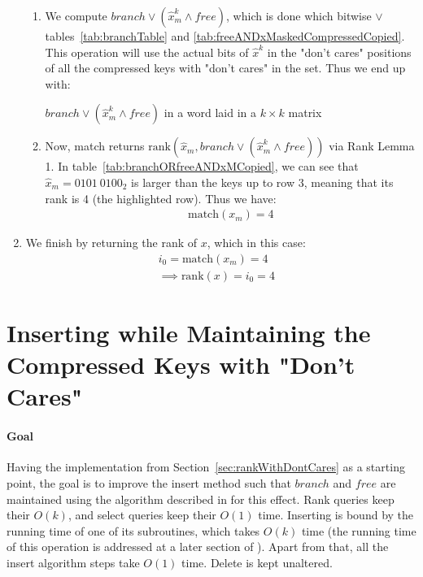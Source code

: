 \begin{enumerate}
\begin{enumerate}
        \item
        We compute $branch \vee (\hat x^k_m \wedge free)$, which is done which bitwise $\vee$ tables~\ref{tab:branchTable} and \ref{tab:freeANDxMaskedCompressedCopied}.
        This operation will use the actual bits of $\hat x^k$ in the "don't cares" positions of all the compressed keys with "don't cares" in the set.
        Thus we end up with:
        \begin{table}[H]
        \centering
        
        \caption[Example of $branch \vee (\hat x^k_m \wedge free)$ in a word laid in a $k \times k$ matrix]{$branch \vee (\hat x^k_m \wedge free)$ in a word laid in a $k \times k$ matrix}
        \label{tab:branchORfreeANDxMCopied}
        \end{table}
        
        \item
        Now, match returns $\text{rank}(\hat x_m, branch \vee (\hat x^k_m \wedge free))$ via Rank Lemma 1. In table~\ref{tab:branchORfreeANDxMCopied}, we can see that $\hat x_m = 0101\ 0100_2$ is larger than the keys up to row 3, meaning that its rank is 4 (the highlighted row). Thus we have:
        \begin{align*}
            \text{match}(x_m) = 4
        \end{align*}
    \end{enumerate}
    
    \item
    We finish by returning the rank of $x$, which in this case:
    \begin{align*}
        i_0 = \text{match}(x_m) = 4& \\
        \implies \text{rank}(x) = i_0 = 4&
    \end{align*}
\end{enumerate}

\newpage
\section{Inserting while Maintaining the Compressed Keys with "Don't Cares"} \label{sec:InsertDontCares}

\paragraph*{Goal}
Having the implementation from Section~\ref{sec:rankWithDontCares} as a starting point, the goal is to improve the insert method such that $branch$ and $free$ are maintained using the algorithm described in \cite{patrascu2014dynamic} for this effect. Rank queries keep their $O(k)$, and select queries keep their $O(1)$ time. Inserting is bound by the running time of one of its subroutines, which takes $O(k)$ time (the running time of this operation is addressed at a later section of \cite{patrascu2014dynamic}). Apart from that, all the insert algorithm steps take $O(1)$ time. Delete is kept unaltered.

